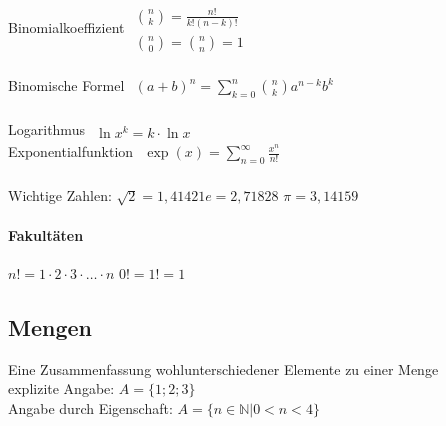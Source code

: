 \documentclass[6pt,a4paper]{scrartcl}
\newcommand{\N}{\ensuremath{\mathbb N}}
\begin{document}
\begin{multicols}{4}
Binomialkoeffizient \qquad \qquad \qquad
\begin{math}\begin{array}{l}
	\binom{n}{k} = \frac{n!}{k!(n-k)!}  \\
	\binom{n}{0} = \binom{n}{n} = 1
\end{array}\end{math}\\ 
\\                   
Binomische Formel \qquad \qquad \qquad 
\begin{math}\begin{array}{l}
	(a+b)^n = \sum\limits_{k = 0}^{n} \binom{n}{k} a^{n-k} b^{k}
\end{array}\end{math}   \\ 
\\
Logarithmus \qquad \qquad \qquad \qquad \quad
\begin{math}\begin{array}{l}
	\ln{x^k}=k \cdot \ln{x}
\end{array}\end{math}   \\ 
Exponentialfunktion \qquad \qquad \qquad
\begin{math}\begin{array}{l}
	\exp(x) = \sum\limits_{n = 0}^\infty \frac{x^n}{n!}
\end{array}\end{math}   \\ 
\\
Wichtige Zahlen: $\sqrt{2} = 1,41421$\quad $e = 2,71828$ \quad $\pi =  3,14159$

\paragraph{Fakultäten} %
\label{par:fakultaeten}
$n! = 1 \cdot 2 \cdot 3 \cdot \ldots \cdot n$ \qquad  $0! = 1! = 1$ 
		



\subsection{Mengen}

Eine Zusammenfassung wohlunterschiedener Elemente zu einer Menge\\
explizite Angabe: $A=\{1;2;3\}$\\
Angabe durch Eigenschaft: $A=\lbrace n \in \N \vert 0<n<4 \rbrace$\\

\end{multicols}
\end{document}
